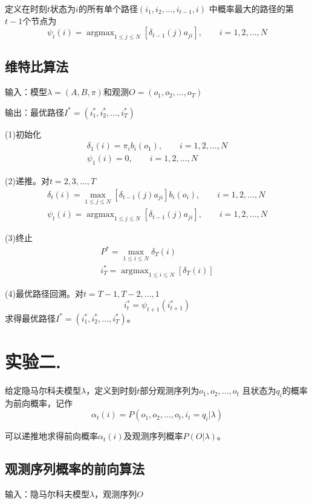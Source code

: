 \documentclass[a4paper,UTF8]{article}
\theoremstyle{definition}
\DeclareMathOperator*{\argmax}{argmax} %
\begin{document}
定义在时刻$t$状态为$i$的所有单个路径$(i_1,i_2,\dots,i_{t-1},i)$
中概率最大的路径的第$t-1$个节点为
\[
	\psi_t(i)=\argmax_{1 \leq j \leq N}[\delta_{t-1}(j)a_{ji}],\qquad
	i=1,2,\dots,N
\]

\subsection*{维特比算法}

输入：模型$\lambda=(A,B,\pi)$和观测$O=(o_1,o_2,\dots,o_T)$

输出：最优路径$I^*=(i_1^*,i_2^*,\dots,i_T^*)$

(1)初始化
\begin{gather*}
	\delta_1(i)=\pi_ib_i(o_1),\qquad i=1,2,\dots,N \\
	\psi_1(i)=0,\qquad i=1,2,\dots,N
\end{gather*}

(2)递推。对$t=2,3,\dots,T$
\begin{gather*}
	\delta_t(i)=\max_{1 \leq j \leq N}[\delta_{t-1}(j)a_{ji}]b_i(o_i),
	\qquad i=1,2,\dots,N \\
	\psi_t(i)=\argmax_{1 \leq j \leq N}[\delta_{t-1}(j)a_{ji}],
	\qquad i=1,2,\dots,N
\end{gather*}

(3)终止
\begin{gather*}
	P^*=\max_{1 \leq i \leq N}\delta_T(i) \\
	i_T^*=\argmax_{1 \leq i \leq N}[\delta_T(i)]
\end{gather*}

(4)最优路径回溯。对$t=T-1,T-2,\dots,1$
\[
	i_t^*=\psi_{t+1}(i_{t+1}^*)
\]
求得最优路径$I^*=(i_1^*,i_2^*,\dots,i_T^*)$。

\section*{实验二.}

给定隐马尔科夫模型$\lambda$，定义到时刻$t$部分观测序列为$o_1,o_2,\dots,o_t$
且状态为$q_i$的概率为前向概率，记作
\[
	\alpha_t(i)=P(o_1,o_2,\dots,o_t,i_t=q_i \vert \lambda)
\]

可以递推地求得前向概率$\alpha_t(i)$及观测序列概率$P(O \vert \lambda)$。

\subsection*{观测序列概率的前向算法}

输入：隐马尔科夫模型$\lambda$，观测序列$O$
\end{document}
